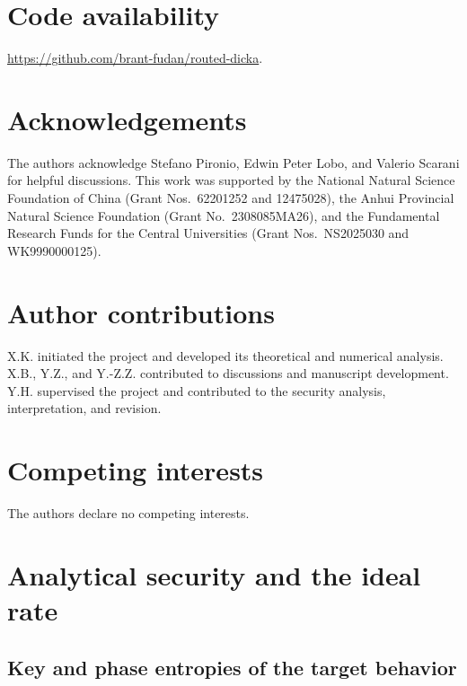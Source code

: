 \documentclass[aps,10pt,onecolumn,prx,superscriptaddress,longbibliography,nofootinbib]{revtex4-2}
\begin{document}
\section*{Code availability}

\url{https://github.com/brant-fudan/routed-dicka}.

\section*{Acknowledgements}

The authors acknowledge Stefano Pironio, Edwin Peter Lobo, and Valerio Scarani for helpful discussions. This work was supported by the National Natural Science Foundation of China (Grant Nos.\ 62201252 and 12475028), the Anhui Provincial Natural Science Foundation (Grant No.\ 2308085MA26), and the Fundamental Research Funds for the Central Universities (Grant Nos.\ NS2025030 and WK9990000125).

\section*{Author contributions}

X.K. initiated the project and developed its theoretical and numerical analysis. X.B., Y.Z., and Y.-Z.Z. contributed to discussions and manuscript development. Y.H. supervised the project and contributed to the security analysis, interpretation, and revision.

\section*{Competing interests}

The authors declare no competing interests.

\clearpage
\appendix

\section{Analytical security and the ideal rate}\label{app:ternary}

\subsection{Key and phase entropies of the target behavior}
\end{document}
